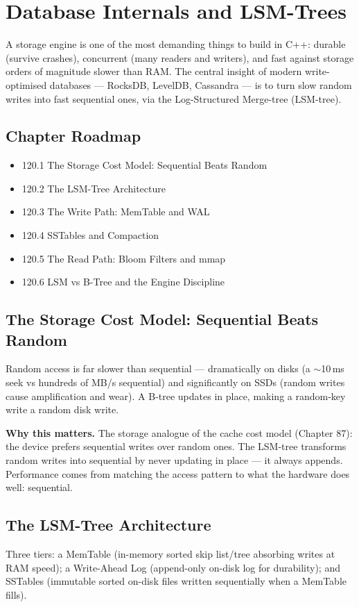\chapter{Database Internals and LSM-Trees}

A storage engine is one of the most demanding things to build in C++: durable (survive crashes), concurrent (many readers and writers), and fast against storage orders of magnitude slower than RAM. The central insight of modern write-optimised databases --- RocksDB, LevelDB, Cassandra --- is to turn slow random writes into fast sequential ones, via the Log-Structured Merge-tree (LSM-tree).

\section*{Chapter Roadmap}
\begin{itemize}
\item 120.1 The Storage Cost Model: Sequential Beats Random
\item 120.2 The LSM-Tree Architecture
\item 120.3 The Write Path: MemTable and WAL
\item 120.4 SSTables and Compaction
\item 120.5 The Read Path: Bloom Filters and mmap
\item 120.6 LSM vs B-Tree and the Engine Discipline
\end{itemize}

\section{The Storage Cost Model: Sequential Beats Random}
Random access is far slower than sequential --- dramatically on disks (a $\sim$10\,ms seek vs hundreds of MB/s sequential) and significantly on SSDs (random writes cause amplification and wear). A B-tree updates in place, making a random-key write a random disk write.

\textbf{Why this matters.} The storage analogue of the cache cost model (Chapter 87): the device prefers sequential writes over random ones. The LSM-tree transforms random writes into sequential by never updating in place --- it always appends. Performance comes from matching the access pattern to what the hardware does well: sequential.

\section{The LSM-Tree Architecture}
Three tiers: a MemTable (in-memory sorted skip list/tree absorbing writes at RAM speed); a Write-Ahead Log (append-only on-disk log for durability); and SSTables (immutable sorted on-disk files written sequentially when a MemTable fills).

